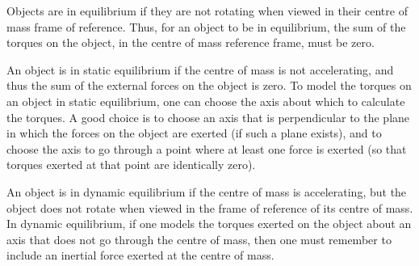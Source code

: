 \begin{chapterSummary}
Objects are in equilibrium if they are not rotating when viewed in their centre of mass frame of reference. Thus, for an object to be in equilibrium, the sum of the torques on the object, in the centre of mass reference frame, must be zero.

An object is in static equilibrium if the centre of mass is not accelerating, and thus the sum of the external forces on the object is zero. To model the torques on an object in static equilibrium, one can choose the axis about which to calculate the torques. A good choice is to choose an axis that is perpendicular to the plane in which the forces on the object are exerted (if such a plane exists), and to choose the axis to go through a point where at least one force is exerted (so that torques exerted at that point are identically zero).

An object is in dynamic equilibrium if the centre of mass is accelerating, but the object does not rotate when viewed in the frame of reference of its centre of mass. In dynamic equilibrium, if one models the torques exerted on the object about an axis that does not go through the centre of mass, then one must remember to include an inertial force exerted at the centre of mass. 


\end{chapterSummary}

